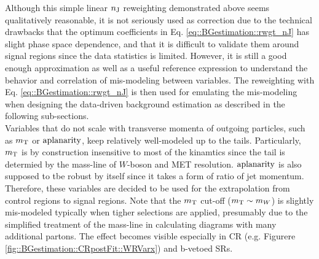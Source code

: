 Although this simple linear $n_{\mathrm{J}}$ reweighting demonstrated above seems qualitatively reasonable, it is not seriously used as correction due to the technical drawbacks that the optimum coefficients in Eq. \ref{eq::BGestimation::rwgt_nJ} has slight phase space dependence, and that it is difficult to validate them around signal regions since the data statistics is limited. However, it is still a good enough approximation as well as a useful reference expression to understand the behavior and correlation of mis-modeling between variables. The reweighting with Eq. \ref{eq::BGestimation::rwgt_nJ} is then used for emulating the mis-modeling when designing the data-driven background estimation as described in the following sub-sections. \\

Variables that do not scale with transverse momenta of outgoing particles, such as $m_{\mathrm{T}}$ or $\mathrm{aplanarity}$, keep relatively well-modeled up to the tails. Particularly, $m_{\mathrm{T}}$ is by construction insensitive to most of the kinamtics since the tail is determied by the mass-line of $W$-boson and MET resolution. $\mathrm{aplanarity}$ is also supposed to tbe robust by itself since it takes a form of ratio of jet momentum. Therefore, these variables are decided to be used for the extrapolation from control regions to signal regions. Note that the $m_{\mathrm{T}}$ cut-off ($m_{\mathrm{T}} \sim m_W$) is slightly mis-modeled typically when tigher selections are applied, presumably due to the simplified treatment of the mass-line in calculating diagrams with many additional partons. The effect becomes visible especially in CR (e.g. Figurere \ref{fig::BGestimation::CRpostFit::WRVarx}) and b-vetoed SRs.



\clearpage


%
\clearpage




